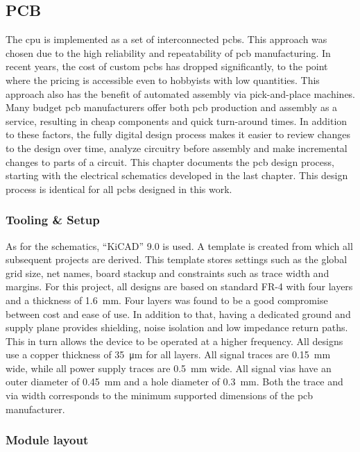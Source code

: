 \subsection{PCB}

The \ac{cpu} is implemented as a set of interconnected \acp{pcb}. This approach was chosen due to the high reliability and repeatability of \ac{pcb} manufacturing. In recent years, the cost of custom \acp{pcb} has dropped significantly, to the point where the pricing is accessible even to hobbyists with low quantities. This approach also has the benefit of automated assembly via pick-and-place machines. Many budget \ac{pcb} manufacturers offer both \ac{pcb} production and assembly as a service, resulting in cheap components and quick turn-around times. In addition to these factors, the fully digital design process makes it easier to review changes to the design over time, analyze circuitry before assembly and make incremental changes to parts of a circuit. This chapter documents the \ac{pcb} design process, starting with the electrical schematics developed in the last chapter. This design process is identical for all \acp{pcb} designed in this work.

\subsubsection{Tooling \& Setup}

As for the schematics, ``KiCAD'' 9.0 is used. A template is created from which all subsequent projects are derived. This template stores settings such as the global grid size, net names, board stackup and constraints such as trace width and margins. For this project, all designs are based on standard FR-4 with four layers and a thickness of \SI{1.6}{\milli\meter}. Four layers was found to be a good compromise between cost and ease of use. In addition to that, having a dedicated ground and supply plane provides shielding, noise isolation and low impedance return paths. This in turn allows the device to be operated at a higher frequency. All designs use a copper thickness of \SI{35}{\micro\meter} for all layers. All signal traces are \SI{0.15}{\milli\meter} wide, while all power supply traces are \SI{0.5}{\milli\meter} wide. All signal vias have an outer diameter of \SI{0.45}{\milli\meter} and a hole diameter of \SI{0.3}{\milli\meter}. Both the trace and via width corresponds to the minimum supported dimensions of the \ac{pcb} manufacturer.

\subsubsection{Module layout}

